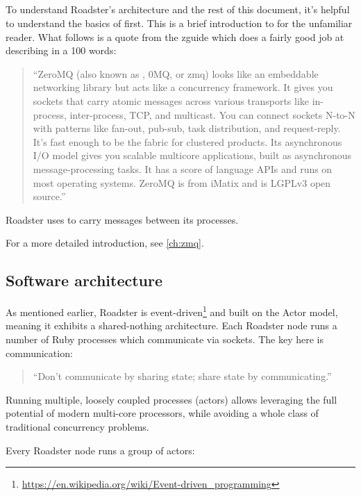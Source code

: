 \subsection{\zmq}
To understand Roadster's architecture and the rest of this document, it's
helpful to understand the basics of \zmq first. This is a brief introduction to
\zmq for the unfamiliar reader. What follows is a quote from the \gls{zguide}
which does a fairly good job at describing \zmq in a 100 words:

\begin{quote}
``ZeroMQ (also known as \zmq, 0MQ, or zmq) looks like an embeddable networking
library but acts like a concurrency framework. It gives you sockets that carry
atomic messages across various transports like in-process, inter-process, TCP,
and multicast. You can connect sockets N-to-N with patterns like fan-out,
pub-sub, task distribution, and request-reply. It's fast enough to be the
fabric for clustered products. Its asynchronous I/O model gives you scalable
multicore applications, built as asynchronous message-processing tasks. It has
a score of language APIs and runs on most operating systems.  ZeroMQ is from
iMatix and is LGPLv3 open source.''
\end{quote}

Roadster uses \zmq to carry messages between its processes.

For a more detailed introduction, see \autoref{ch:zmq}.

\subsection{Software architecture}
As mentioned earlier, Roadster is event-driven\footnote{\url{https://en.wikipedia.org/wiki/Event-driven_programming}} and built on the Actor model, meaning it exhibits a
shared-nothing architecture. Each Roadster node runs a number of Ruby processes
which communicate via \zmq sockets. The key here is communication:

\begin{quote}
``Don't communicate by sharing state; share state by communicating.''
\end{quote}

Running multiple, loosely coupled processes (actors) allows leveraging the full
potential of modern multi-core processors, while avoiding a whole class of
traditional concurrency problems.

Every Roadster node runs a group of actors:


